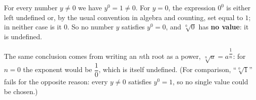 For every number $y\ne0$ we have $y^0=1\ne0$. For $y=0$, the expression $0^0$ is either left undefined or, by the usual convention in algebra and counting, set equal to $1$; in neither case is it $0$. So no number $y$ satisfies $y^0=0$, and $\sqrt[0]{0}$ has \textbf{no value}: it is undefined.

The same conclusion comes from writing an $n$th root as a power, $\sqrt[n]{a}=a^{\dfrac1n}$: for $n=0$ the exponent would be $\dfrac10$, which is itself undefined. (For comparison, ``$\sqrt[0]{1}$'' fails for the opposite reason: every $y\ne0$ satisfies $y^0=1$, so no single value could be chosen.)
